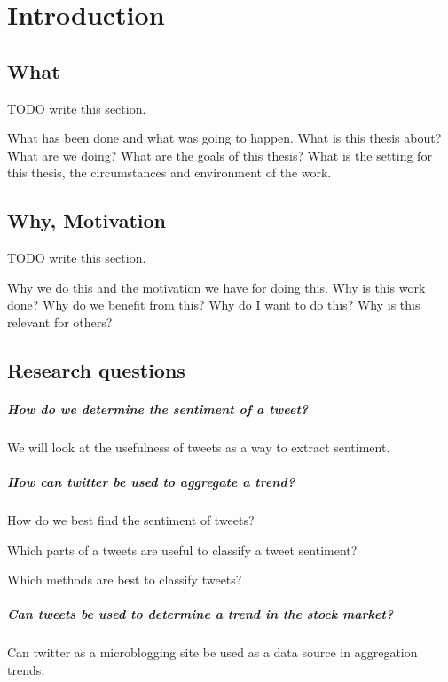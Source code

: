\chapter{Introduction}

\section{What}
TODO write this section.

What has been done and what was going to happen.
What is this thesis about? What are we doing? What are the goals of this
thesis? What is the setting for this thesis, the circumstances and environment
of the work. 

\section{Why, Motivation}
TODO write this section.

Why we do this and the motivation we have for doing this.
Why is this work done? Why do we benefit from this? Why do I want to do this?
Why is this relevant for others? 

\section{Research questions}

\paragraph{How do we determine the sentiment of a tweet?\\}
	We will look at the usefulness of tweets as a way to extract sentiment. 

\paragraph{How can twitter be used to aggregate a trend?\\}
How do we best find the sentiment of tweets?

Which parts of a tweets are useful to classify a tweet sentiment?

Which methods are best to classify tweets? 
 
\paragraph{Can tweets be used to determine a trend in the stock market?\\}
Can twitter as a microblogging site be used as a data source in aggregation trends.

